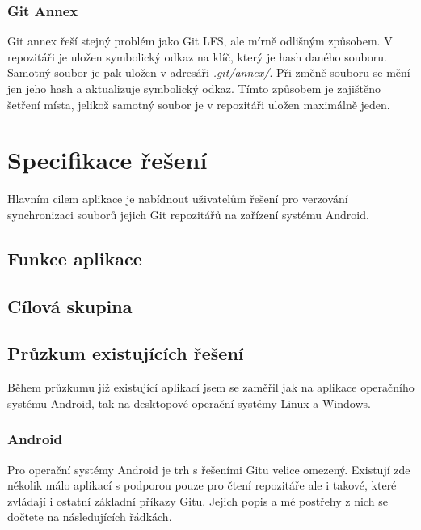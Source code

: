 \subsection{Git Annex}
Git annex řeší stejný problém jako Git LFS, ale mírně odlišným způsobem. V repozitáři je uložen symbolický odkaz na klíč, který je hash daného souboru. Samotný soubor je pak uložen v adresáři \emph{.git/annex/}. Při změně souboru se mění jen jeho hash a aktualizuje symbolický odkaz. Tímto způsobem je zajištěno šetření místa, jelikož samotný soubor je v repozitáři uložen maximálně jeden.

\chapter{Specifikace řešení}
Hlavním cilem aplikace je nabídnout uživatelům řešení pro verzování synchronizaci souborů jejich Git repozitářů na zařízení systému Android.

\section{Funkce aplikace}

\section{Cílová skupina}

\section{Průzkum existujících řešení}
Během průzkumu již existující aplikací jsem se zaměřil jak na aplikace operačního systému Android, tak na desktopové operační systémy Linux a Windows.

    \subsection {Android}
    Pro operační systémy Android je trh s řešeními Gitu velice omezený. Existují zde několik málo aplikací s podporou pouze pro čtení repozitáře ale i takové, které zvládají i ostatní základní příkazy Gitu. Jejich popis a mé postřehy z nich se dočtete na následujících řádkách.
